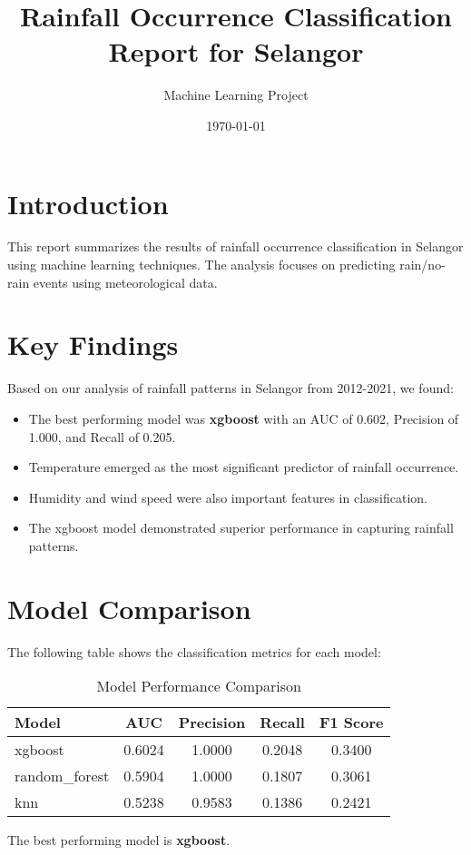 \documentclass{article}
\title{Rainfall Occurrence Classification Report for Selangor}
\author{Machine Learning Project}
\date{\today}
\begin{document}
\maketitle

\section{Introduction}
This report summarizes the results of rainfall occurrence classification in Selangor using machine learning techniques. 
The analysis focuses on predicting rain/no-rain events using meteorological data.

\section{Key Findings}
Based on our analysis of rainfall patterns in Selangor from 2012-2021, we found:
\begin{itemize}
    \item The best performing model was \textbf{xgboost} with an AUC of 0.602, Precision of 1.000, and Recall of 0.205.
    \item Temperature emerged as the most significant predictor of rainfall occurrence.
    \item Humidity and wind speed were also important features in classification.
    \item The xgboost model demonstrated superior performance in capturing rainfall patterns.
\end{itemize}

\section{Model Comparison}
The following table shows the classification metrics for each model:

\begin{table}[h]
\centering
\caption{Model Performance Comparison}
\begin{tabular}{lcccc}
\toprule
Model & AUC & Precision & Recall & F1 Score \\
\midrule
xgboost & 0.6024 & 1.0000 & 0.2048 & 0.3400 \\
random\_forest & 0.5904 & 1.0000 & 0.1807 & 0.3061 \\
knn & 0.5238 & 0.9583 & 0.1386 & 0.2421 \\
\bottomrule
\end{tabular}
\end{table}

The best performing model is \textbf{xgboost}.
\end{document}
